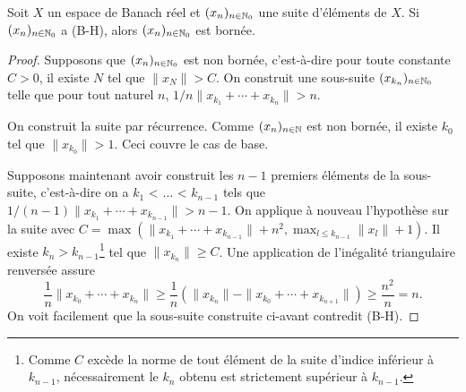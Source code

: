\begin{prop}
  Soit $X$ un espace de Banach réel et $(x_n)_{n\in\mathbb{N}_0}$ une suite
  d'éléments de
  $X$. Si $(x_n)_{n\in\mathbb{N}_0}$ a (B-H), alors $(x_n)_{n\in\mathbb{N}_0}$ est bornée.
\end{prop}
\begin{proof}
  Supposons que $(x_n)_{n\in\mathbb{N}_0}$ est non bornée, c'est-à-dire pour toute
  constante $C > 0$, il existe $N$ tel que $\|x_N\|> C$. On construit
  une sous-suite $(x_{k_n})_{n\in\mathbb{N}_0}$ telle que pour tout naturel $n$,
  $1/n \|x_{k_1} + \cdots + x_{k_n}\| > n$.

  On construit la suite par récurrence.
  Comme $(x_n)_{n\in\mathbb{N}}$ est non bornée, il existe $k_0$ tel que
  $\|x_{k_0}\| >1$. Ceci couvre le cas de base.

  Supposons maintenant avoir construit les $n-1$ premiers éléments de
  la sous-suite, c'est-à-dire on a $k_1$ < $\ldots$ < $k_{n-1}$ tels que
  $1/(n-1) \|x_{k_1} + \cdots + x_{k_{n-1}}\| > n-1$. On applique
  à nouveau l'hypothèse sur la suite avec
  $C = \max(\|x_{k_1} + \cdots + x_{k_{n-1}}\| + n^2,
  \max_{l\leq k_{n-1}}\|x_l\|+1)$. Il existe $k_n > k_{n-1}$\footnote{
    Comme $C$ excède la norme de tout élément de la suite d'indice
    inférieur à $k_{n-1}$, nécessairement le $k_n$ obtenu est
    strictement supérieur à $k_{n-1}$.
  }
  tel que $\|x_{k_n}\| \geq C$. Une application de \og{}l'inégalité
  triangulaire renversée\fg{} assure
  $$ \frac{1}{n} \|x_{k_0} + \cdots + x_{k_n}\| \geq
  \frac{1}{n} (\|x_{k_n}\| - \|x_{k_0} + \cdots + x_{k_{n+1}}\|)
  \geq \frac{n^2}{n} = n.$$
  On voit facilement que la sous-suite construite ci-avant contredit (B-H).
\end{proof}

